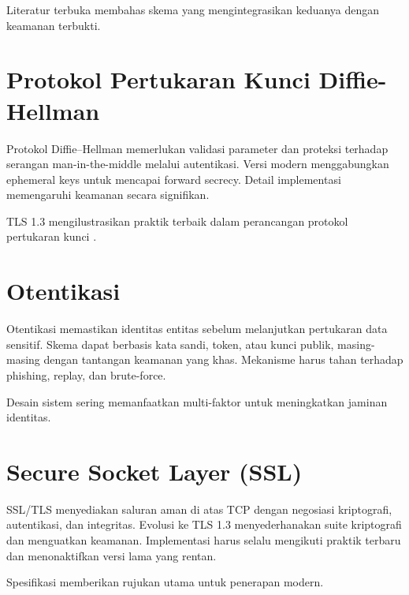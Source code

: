 \documentclass[../main.tex]{subfiles}
\begin{document}
Literatur terbuka membahas skema yang mengintegrasikan keduanya dengan keamanan terbukti.

\section{Protokol Pertukaran Kunci Diffie-Hellman}
Protokol Diffie--Hellman memerlukan validasi parameter dan proteksi terhadap serangan man-in-the-middle melalui autentikasi. Versi modern menggabungkan ephemeral keys untuk mencapai forward secrecy. Detail implementasi memengaruhi keamanan secara signifikan.

TLS 1.3 mengilustrasikan praktik terbaik dalam perancangan protokol pertukaran kunci \parencite{rfc8446}.

\section{Otentikasi}
Otentikasi memastikan identitas entitas sebelum melanjutkan pertukaran data sensitif. Skema dapat berbasis kata sandi, token, atau kunci publik, masing-masing dengan tantangan keamanan yang khas. Mekanisme harus tahan terhadap phishing, replay, dan brute-force.

Desain sistem sering memanfaatkan multi-faktor untuk meningkatkan jaminan identitas.

\section{Secure Socket Layer (SSL)}
SSL/TLS menyediakan saluran aman di atas TCP dengan negosiasi kriptografi, autentikasi, dan integritas. Evolusi ke TLS 1.3 menyederhanakan suite kriptografi dan menguatkan keamanan. Implementasi harus selalu mengikuti praktik terbaru dan menonaktifkan versi lama yang rentan.

Spesifikasi \textcite{rfc8446} memberikan rujukan utama untuk penerapan modern.
\end{document}

